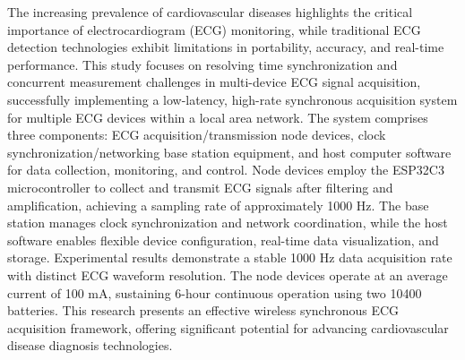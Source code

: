 {}

\begin{abstracten}
    The increasing prevalence of cardiovascular diseases highlights the critical importance of electrocardiogram (ECG) monitoring, while traditional ECG detection technologies exhibit limitations in portability, accuracy, and real-time performance. This study focuses on resolving time synchronization and concurrent measurement challenges in multi-device ECG signal acquisition, successfully implementing a low-latency, high-rate synchronous acquisition system for multiple ECG devices within a local area network.
    The system comprises three components: ECG acquisition/transmission node devices, clock synchronization/networking base station equipment, and host computer software for data collection, monitoring, and control. Node devices employ the ESP32C3 microcontroller to collect and transmit ECG signals after filtering and amplification, achieving a sampling rate of approximately 1000 Hz. The base station manages clock synchronization and network coordination, while the host software enables flexible device configuration, real-time data visualization, and storage.
    Experimental results demonstrate a stable 1000 Hz data acquisition rate with distinct ECG waveform resolution. The node devices operate at an average current of 100 mA, sustaining 6-hour continuous operation using two 10400 batteries. This research presents an effective wireless synchronous ECG acquisition framework, offering significant potential for advancing cardiovascular disease diagnosis technologies.
\end{abstracten}